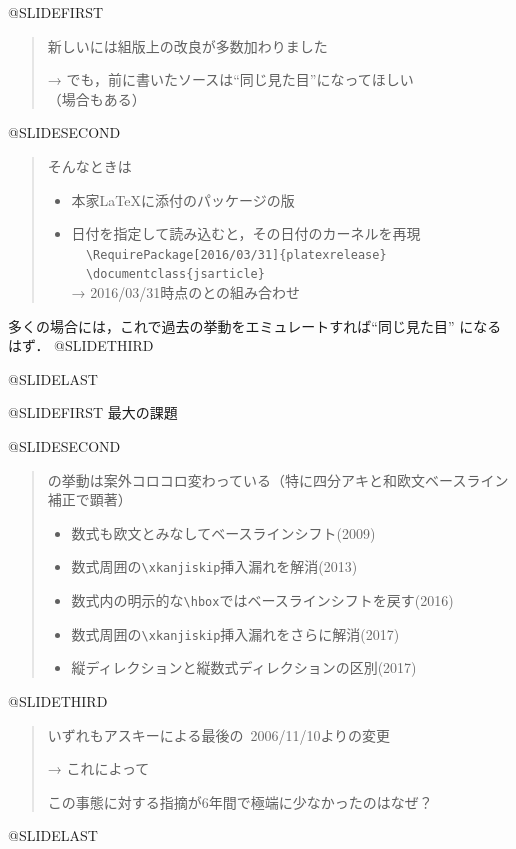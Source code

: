 \documentclass[a4paper,papersize,25pt,slide,dvipdfmx]{jsarticle}
\begin{document}
@SLIDEFIRST
\begin{quote}
新しい\pLaTeX には組版上の改良が多数加わりました\par
→ でも，前に書いたソースは“同じ見た目”になってほしい
{\footnotesize （場合もある）}
\end{quote}
@SLIDESECOND
\begin{quote}
そんなときは
\begin{center}
{\Large{}}
\end{center}
\begin{itemize}
  \item 本家\LaTeX に添付のパッケージの\pLaTeX 版
  \item 日付を指定して読み込むと，その日付の\pLaTeX カーネルを再現 \\
        \verb+  \RequirePackage[2016/03/31]{platexrelease}+\\
        \verb+  \documentclass{jsarticle}+\\
→ 2016/03/31時点の\LaTeXe と\pLaTeXe の組み合わせ
\end{itemize}
\end{quote}
多くの場合には，これで過去の挙動をエミュレートすれば“同じ見た目”
になるはず．
@SLIDETHIRD
\begin{center}
\end{center}
@SLIDELAST
\SLIDEEND

@SLIDEFIRST
最大の課題
\begin{center}\large
{}
\end{center}\smallskip
@SLIDESECOND
\begin{quote}
\pTeX の挙動は案外コロコロ変わっている（特に四分アキと和欧文ベースライン補正で顕著）
\begin{itemize}
\item 数式も欧文とみなしてベースラインシフト(2009)
\item 数式周囲の\verb+\xkanjiskip+挿入漏れを解消(2013)
\item 数式内の明示的な\verb+\hbox+ではベースラインシフトを戻す(2016)
\item 数式周囲の\verb+\xkanjiskip+挿入漏れをさらに解消(2017)
\item 縦ディレクションと縦数式ディレクションの区別(2017)
\end{itemize}
\end{quote}
@SLIDETHIRD
\begin{quote}
いずれもアスキーによる最後の\pLaTeX~2006/11/10よりの変更\par
→ これによって\par
{\small この事態に対する指摘が6年間で極端に少なかったのはなぜ？}
\end{quote}
@SLIDELAST
\SLIDEEND
\end{document}
